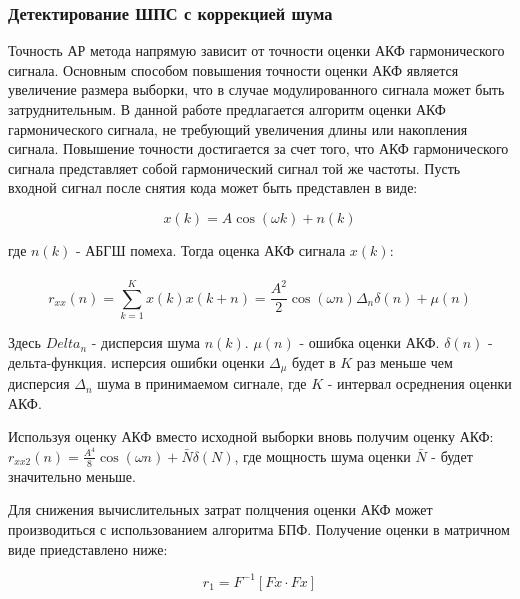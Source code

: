 \subsubsection{Детектирование ШПС с коррекцией шума}
Точность АР метода напрямую зависит от точности оценки АКФ гармонического сигнала. Основным способом повышения точности оценки
АКФ является увеличение размера выборки, что в случае модулированного сигнала может быть затруднительным. В данной работе
предлагается алгоритм оценки АКФ гармонического сигнала, не требующий увеличения длины или накопления сигнала.
Повышение точности достигается за счет того, что АКФ гармонического сигнала представляет собой гармонический сигнал той же частоты.
Пусть входной сигнал после снятия кода может быть представлен в виде:

\begin{center}
\begin{equation}
	x(k)=A \cos{(\omega k)} + n(k)
\end{equation}
\end{center}

где ${n(k)}$ - АБГШ помеха. Тогда оценка АКФ сигнала ${x(k)}$:

\begin{center}
\begin{equation}
	\hat{r_{xx}(n) = \sum \limits_{k=1}^{K} x(k)x(k+n) = \frac{A^2}{2} \cos{(\omega{n})} \Delta_n \delta{(n)} + \mu{(n)}}
\end{equation}
\end{center}

Здесь ${Delta_n}$ - дисперсия шума ${n(k)}$. ${\mu{(n)}}$ - ошибка оценки АКФ. ${\delta{(n)}}$ - дельта-функция. исперсия ошибки
оценки ${\Delta_{\mu}}$ будет в ${K}$ раз меньше чем дисперсия ${\Delta_n}$ шума в принимаемом сигнале, где ${K}$ - интервал
осреднения оценки АКФ.

Используя оценку АКФ вместо исходной выборки вновь получим оценку АКФ:
${r_{xx2}(n) = \frac{A^4}{8} \cos{(\omega n)} + \bar{N} \delta{(N)}}$,
где мощность шума оценки ${\bar{N}}$ - будет значительно меньше.

Для снижения вычислительных затрат полцчения оценки АКФ может производиться с использованием алгоритма БПФ. Получение оценки в 
матричном виде приедставлено ниже:

\begin{center}
\begin{equation}
	r_1 = F^{-1}[Fx \cdot Fx]
\end{equation}
\end{center}

